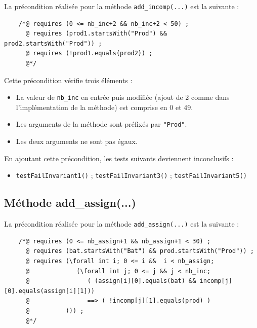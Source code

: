 \documentclass{article}
\begin{document}
\noindent
La précondition réalisée pour la méthode \texttt{add\_incomp(...)} est la suivante :
\vspace{0.3cm}

\noindent
\begin{verbatim}
    /*@ requires (0 <= nb_inc+2 && nb_inc+2 < 50) ;
      @ requires (prod1.startsWith("Prod") && prod2.startsWith("Prod")) ; 
      @ requires (!prod1.equals(prod2)) ;
      @*/
\end{verbatim}

\noindent
Cette précondition vérifie trois éléments :
\begin{itemize}
\item La valeur de \texttt{nb\_inc} en entrée puis modifiée (ajout de 2 comme dans l'implémentation de la méthode) est comprise en 0 et 49.
\item Les arguments de la méthode sont préfixés par \texttt{"Prod"}.
\item Les deux arguments ne sont pas égaux.
\end{itemize}

\vspace{0.3cm}
\noindent
En ajoutant cette précondition, les tests suivants deviennent inconclusifs :
\begin{itemize}
\renewcommand{\labelitemi}{$\rightarrow$} 
\item \texttt{testFailInvariant1()} ; \texttt{testFailInvariant3()} ; \texttt{testFailInvariant5()}
\end{itemize}

\subsection{Méthode add\_assign(...)}

\noindent
La précondition réalisée pour la méthode \texttt{add\_assign(...)} est la suivante :
\vspace{0.3cm}

\noindent
\begin{verbatim}
    /*@ requires (0 <= nb_assign+1 && nb_assign+1 < 30) ;
      @ requires (bat.startsWith("Bat") && prod.startsWith("Prod")) ;
      @ requires (\forall int i; 0 <= i &&  i < nb_assign;
      @	            (\forall int j; 0 <= j && j < nb_inc;
      @	               ( (assign[i][0].equals(bat) && incomp[j][0].equals(assign[i][1]))
      @	               ==> ( !incomp[j][1].equals(prod) )
      @          ))) ;
      @*/
\end{verbatim}
\vspace{0.2cm}
\end{document}
